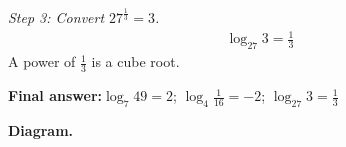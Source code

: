 \documentclass[11pt]{article}
\begin{document}
\textit{Step 3: Convert \( 27^{\frac{1}{3}} = 3 \).}
\[\begin{gathered}
\log_{27} 3 = \frac{1}{3}
\end{gathered}\]
A power of \( \frac{1}{3} \) is a cube root.

\begin{answerbox}
\textbf{Final answer:}\quad \(\displaystyle  \log_7 49 = 2 \); \(\displaystyle  \log_4 \frac{1}{16} = -2 \); \(\displaystyle  \log_{27} 3 = \frac{1}{3} \)
\end{answerbox}
\textbf{Diagram.}

\begin{center}
\end{center}
\end{document}
